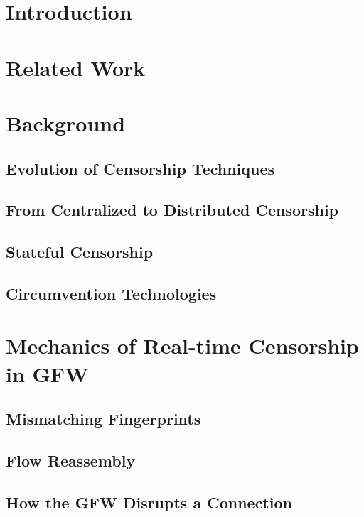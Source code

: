\section{Introduction}
\blindtext

\section{Related Work}
\blindtext

\section{Background}

\subsection{Evolution of Censorship Techniques}
\blindtext

\subsection{From Centralized to Distributed Censorship}
\blindtext

\subsection{Stateful Censorship}
\blindtext

\subsection{Circumvention Technologies}
\blindtext

\section{Mechanics of Real-time Censorship in GFW}
\blindtext

\subsection{Mismatching Fingerprints}
\blindtext

\subsection{Flow Reassembly}
\blindtext

\subsection{How the GFW Disrupts a Connection}
\blindtext

